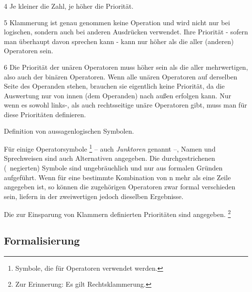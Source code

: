 \begin{table}
\begin{threeparttable}
\begin{tablenotes}
			\item[4] Je kleiner die Zahl, je höher die Priorität.
			\item[5] Klammerung ist genau genommen keine Operation und wird nicht nur bei logischen, sondern auch bei anderen Ausdrücken verwendet. Ihre Priorität - sofern man überhaupt davon sprechen kann - kann nur höher als die aller (anderen) Operatoren sein.
			\item[6] Die Priorität der unären Operatoren muss höher sein als die aller mehrwertigen, also auch der binären Operatoren.
			Wenn alle unären Operatoren auf derselben Seite des Operanden stehen, brauchen sie eigentlich keine Priorität, da die Auswertung nur von innen (dem Operanden) nach außen erfolgen kann.
			Nur wenn es sowohl links-, als auch rechtsseitige unäre Operatoren gibt, muss man für diese Prioritäten definieren.
		\end{tablenotes}
	\end{threeparttable}
	\caption{Definition von aussagenlogischen Symbolen.}
	\label{tab:Symbole}%
\end{table}

Für einige Operatorsymbole%
\footnote{Symbole, die für Operatoren verwendet werden.}
-- auch \emph{Junktoren} genannt --, Namen und Sprechweisen sind auch Alternativen angegeben.
Die durchgestrichenen (\textdh\ negierten) Symbole sind ungebräuchlich und nur aus formalen Gründen aufgeführt.
Wenn für eine bestimmte Kombination von n mehr als eine Zeile angegeben ist, so können die zugehörigen Operatoren zwar formal verschieden sein, liefern in der zweiwertigen  jedoch dieselben Ergebnisse.

Die zur Einsparung von Klammern definierten Prioritäten sind  angegeben.%
\footnote{Zur Erinnerung: Es gilt Rechtsklammerung. }

\subsection{Formalisierung}%
\label{sub:Formalisierung}

